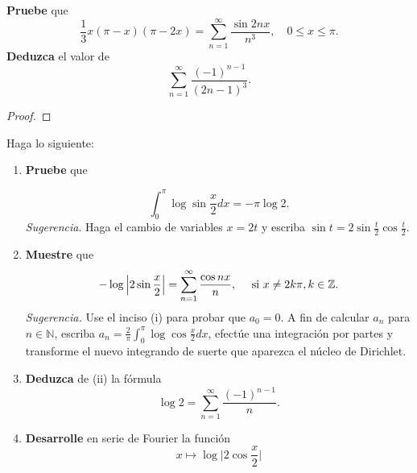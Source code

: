 \documentclass[12pt]{report}
\theoremstyle{largebreak}
\begin{document}
    \begin{excer}
        \textbf{Pruebe} que
        \begin{equation*}
            \frac{1}{3}x(\pi-x)(\pi-2x)=\sum_{ n=1}^\infty\frac{\sin 2nx}{n^3},\quad 0\leq x\leq \pi.
        \end{equation*}
        \textbf{Deduzca} el valor de
        \begin{equation*}
            \sum_{ n=1}^\infty\frac{(-1)^{ n-1}}{(2n-1)^3}.
        \end{equation*}
    \end{excer}

    \begin{proof}
        
    \end{proof}

    \renewcommand{\theenumi}{\textbf{\roman{enumi}}}
    
    \begin{excer}
        Haga lo siguiente:
        \begin{enumerate}
            \item \textbf{Pruebe} que
            
            \begin{equation*}
                \int_0^\pi\log\sin\frac{x}{2}dx=-\pi\log2.
            \end{equation*}
            \textit{Sugerencia}. Haga el cambio de variables $x=2t$ y escriba $\sin t =2\sin\frac{t}{2}\cos\frac{t}{2}$.
            \item \textbf{Muestre} que
            \begin{equation*}
                -\log\Big|2\sin\frac{x}{2}\Big|=\sum_{ n=1}^\infty\frac{\cos nx}{n},\quad\textup{ si }x\neq 2k\pi,k\in\mathbb{Z}.
            \end{equation*}
            \textit{Sugerencia.} Use el inciso (i) para probar que $a_0=0$. A fin de calcular $a_n$ para $n\in\mathbb{N}$, escriba $a_n=\frac{2}{\pi}\int_0^\pi\log\cos\frac{x}{2}dx$, efectúe una integración por partes y transforme el nuevo integrando de suerte que aparezca el núcleo de Dirichlet.
            \item \textbf{Deduzca} de (ii) la fórmula
            \begin{equation*}
                \log2=\sum_{ n=1}^\infty\frac{(-1)^{ n-1}}{n}.
            \end{equation*}
            \item \textbf{Desarrolle} en serie de Fourier la función
            \begin{equation*}
                x\mapsto\log\Big|2\cos\frac{x}{2}\Big|
            \end{equation*}
        \end{enumerate}
    \end{excer}
\end{document}
